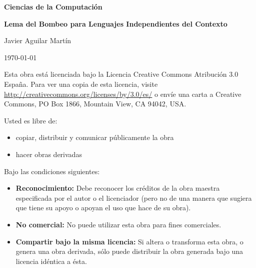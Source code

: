 \documentclass[twoside]{article}
\begin{document}
\begin{titlepage}
	\centering
	{\huge\bfseries Ciencias de la Computación \par}
	\vspace{1cm}
	{\Huge\bfseries Lema del Bombeo para Lenguajes Independientes del Contexto\par}
	\vspace{1cm}
	{\Large Javier Aguilar Martín\par}
	\vspace{1cm}
	{\large \today\par}
	\vspace{1cm}

\begin{abstract}
\normalsize
En este trabajo se trata de probar una versión del lema del bombeo para
lenguajes independientes del contexto y utilizarlo para dar
ejemplos de lenguajes que no son lenguajes independientes
del contexto.
\end{abstract}

	\vfill
	{\small Esta obra está licenciada bajo la Licencia Creative Commons Atribución 3.0 España. Para ver una copia de esta licencia, visite \url{http://creativecommons.org/licenses/by/3.0/es/} o envíe una carta a Creative Commons, PO Box 1866, Mountain View, CA 94042, USA.

\bigskip

Usted es libre de:
\begin{itemize}
 \item copiar, distribuir y comunicar públicamente la obra
\item hacer obras derivadas
\end{itemize}

Bajo las condiciones siguientes:
\begin{itemize}
 \item {\bf Reconocimiento:} Debe reconocer los créditos de la obra maestra especificada por el autor o el licenciador (pero no de una manera que sugiera que tiene su apoyo o apoyan el uso que hace de su obra).
 \item {\bf No comercial:} No puede utilizar esta obra para fines comerciales.
\item {\bf Compartir bajo la misma licencia:} Si altera o transforma esta obra, o genera una obra derivada, sólo puede distribuir la obra generada bajo una licencia idéntica a ésta.
\end{itemize}}

	
\end{titlepage}
\end{document}
